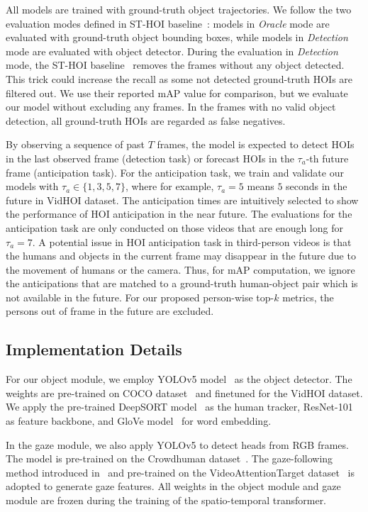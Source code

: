 \documentclass[times,twocolumn,final,authoryear]{elsarticle}
\begin{document}
All models are trained with ground-truth object trajectories. We follow the two evaluation modes defined in ST-HOI baseline~\citep{hoi_v_set:VidHOI}: models in \emph{Oracle} mode are evaluated with ground-truth object bounding boxes, while models in \emph{Detection} mode are evaluated with object detector. During the evaluation in \emph{Detection} mode, the ST-HOI baseline~\citep{hoi_v_set:VidHOI} removes the frames without any object detected. This trick could increase the recall as some not detected ground-truth HOIs are filtered out. We use their reported mAP value for comparison, but we evaluate our model without excluding any frames. In the frames with no valid object detection, all ground-truth HOIs are regarded as false negatives.

By observing a sequence of past $T$ frames, the model is expected to detect HOIs in the last observed frame (detection task) or forecast HOIs in the $\tau_a$-th future frame (anticipation task). For the anticipation task, we train and validate our models with $\tau_a \in \{1, 3, 5, 7\}$, where for example, $\tau_a=5$ means $5$ seconds in the future in VidHOI dataset. The anticipation times are intuitively selected to show the performance of HOI anticipation in the near future. The evaluations for the anticipation task are only conducted on those videos that are enough long for $\tau_a=7$. A potential issue in HOI anticipation task in third-person videos is that the humans and objects in the current frame may disappear in the future due to the movement of humans or the camera. Thus, for mAP computation, we ignore the anticipations that are matched to a ground-truth human-object pair which is not available in the future. For our proposed person-wise top-$k$ metrics, the persons out of frame in the future are excluded.





\subsection{Implementation Details}
For our object module, we employ YOLOv5 model~\citep{detection:yolov5} as the object detector. The weights are pre-trained on COCO dataset~\citep{detection:COCO} and finetuned for the VidHOI dataset. We apply the pre-trained DeepSORT model~\citep{tracking:deepsort} as the human tracker, ResNet-101~\citep{cnn:ResNet} as feature backbone, and GloVe model~\citep{semantic:glove} for word embedding. 

In the gaze module, we also apply YOLOv5 to detect heads from RGB frames. The model is pre-trained on the Crowdhuman dataset~\citep{detection:crowdhuman}. The gaze-following method introduced in~\citep{gaze:detecting_attended} and pre-trained on the VideoAttentionTarget dataset~\citep{gaze:detecting_attended} is adopted to generate gaze features. All weights in the object module and gaze module are frozen during the training of the spatio-temporal transformer. 
\end{document}
